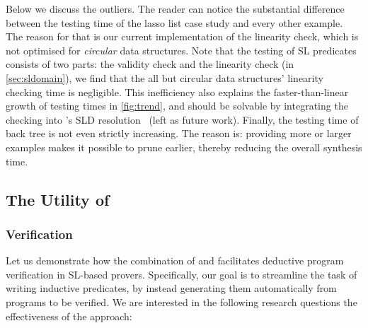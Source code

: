 Below we discuss the outliers. 
%
The reader can notice the substantial difference between
the testing time of the lasso list case study and every other example.
%
The reason for that is our current implementation of the linearity
check, which is not optimised for \emph{circular} data structures. 
%
Note that the testing of SL predicates consists of two parts: the
 \prolog validity check and the linearity check (in
\autoref{sec:sldomain}), we find that the all but circular data
structures' linearity checking time is negligible. This inefficiency
also explains the faster-than-linear growth of testing times in
\autoref{fig:trend}, and should be solvable by integrating the
checking into \prolog's SLD
resolution~\cite{DBLP:conf/ifip/Kowalski74} (left as
future work).
%
Finally, the testing time of back tree is not even strictly
increasing. The reason is: providing more or larger
examples makes it possible to prune
earlier, thereby reducing the overall synthesis time.
%


%


\subsection{The Utility of \tool}
\label{sec:utility}

\subsubsection{Verification}
\label{sec:verification}

Let us demonstrate how the combination of \tool and \ggen facilitates
deductive program verification in SL-based provers. 
%
Specifically, our goal is to streamline the task of writing inductive
predicates, by instead generating them automatically from programs to
be verified.
%
We are interested in the following research questions \wrt the
effectiveness of the approach:

